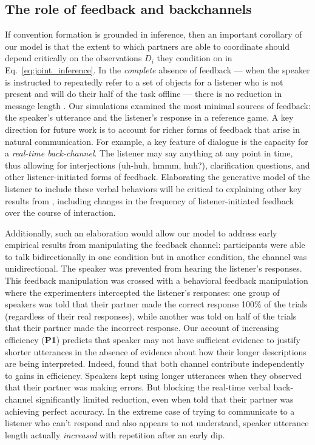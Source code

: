 \subsection{The role of feedback and backchannels}

If convention formation is grounded in inference, then an important corollary of our model is that the extent to which partners are able to coordinate should depend critically on the observations $D_i$ they condition on in Eq.~\ref{eq:joint_inference}.
In the \emph{complete} absence of feedback --- when the speaker is instructed to repeatedly refer to a set of objects for a listener who is not present and will do their half of the task offline --- there is no reduction in message length . 
Our simulations examined the most minimal sources of feedback: the speaker's utterance and the listener's response in a reference game.
A key direction for future work is to account for richer forms of feedback that arise in natural communication.
For example, a key feature of dialogue is the capacity for a \emph{real-time back-channel}.
The listener may say anything at any point in time, thus allowing for interjections (uh-huh, hmmm, huh?), clarification questions, and other listener-initiated forms of feedback. 
Elaborating the generative model of the listener to include these verbal behaviors will be critical to explaining other key results from , including changes in the frequency of listener-initiated feedback over the course of interaction.

Additionally, such an elaboration would allow our model to address early empirical results from  manipulating the feedback channel: participants were able to talk bidirectionally in one condition but in another condition, the channel was unidirectional. 
The speaker was prevented from hearing the listener's responses. 
This feedback manipulation was crossed with a behavioral feedback manipulation where the experimenters intercepted the listener's responses: one group of speakers was told that their partner made the correct response 100\% of the trials (regardless of their real responses), while another was told on half of the trials that their partner made the incorrect response. 
Our account of increasing efficiency (\textbf{P1}) predicts that speaker may not have sufficient evidence to justify shorter utterances in the absence of evidence about how their longer descriptions are being interpreted.
Indeed,  found that both channel contribute independently to gains in efficiency.
Speakers kept using longer utterances when they observed that their partner was making errors. 
But blocking the real-time verbal back-channel significantly limited reduction, even when told that their partner was achieving perfect accuracy.
In the extreme case of trying to communicate to a listener who can't respond and also appears to not understand, speaker utterance length actually \emph{increased} with repetition after an early dip. 

